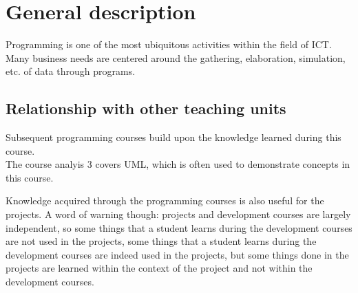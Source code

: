 \section{General description}
		Programming is one of the most ubiquitous activities within the field of ICT. Many business needs are centered around the gathering, elaboration, simulation, etc. of data through programs. \\
		

	\subsection{Relationship with other teaching units}
		Subsequent programming courses build upon the knowledge learned during this course.	\\
		
		The course analyis 3 covers UML, which is often used to demonstrate concepts in this course.
		
		Knowledge acquired through the programming courses is also useful for the projects. A word of warning though: projects and development courses are largely independent, so some things that a student learns during the development courses are not used in the projects, some things that a student learns during the development courses are indeed used in the projects, but some things done in the projects are learned within the context of the project and not within the development courses.

